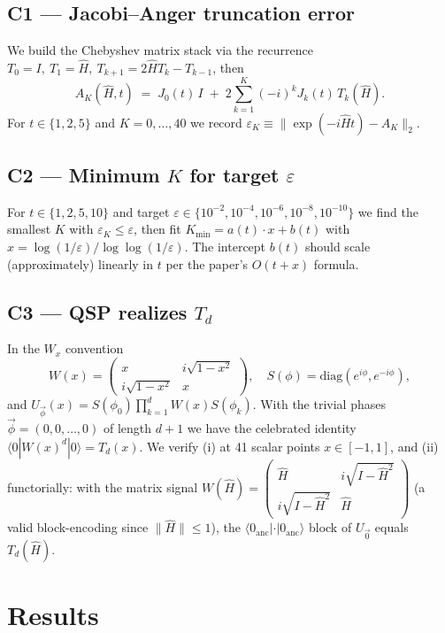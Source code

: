\documentclass[11pt]{article}
\begin{document}
\subsection{C1 --- Jacobi--Anger truncation error}
We build the Chebyshev matrix stack via the recurrence
$T_0=I,\ T_1=\hat H,\ T_{k+1}=2\hat H T_k - T_{k-1}$, then
\[
  A_K(\hat H,t) \;=\; J_0(t)\,I \;+\; 2\sum_{k=1}^{K} (-i)^k J_k(t)\, T_k(\hat H).
\]
For $t\in\{1,2,5\}$ and $K=0,\ldots,40$ we record
$\varepsilon_K \equiv \|\exp(-i\hat H t)-A_K\|_2$.

\subsection{C2 --- Minimum $K$ for target $\varepsilon$}
For $t\in\{1,2,5,10\}$ and target $\varepsilon\in\{10^{-2},10^{-4},10^{-6},10^{-8},10^{-10}\}$
we find the smallest $K$ with $\varepsilon_K\le\varepsilon$, then fit
$K_{\min} = a(t)\cdot x + b(t)$ with $x = \log(1/\varepsilon)/\log\log(1/\varepsilon)$.
The intercept $b(t)$ should scale (approximately) linearly in $t$ per the
paper's $O(t+x)$ formula.

\subsection{C3 --- QSP realizes $T_d$}
In the $W_x$ convention
\[
  W(x)=\begin{pmatrix} x & i\sqrt{1-x^2}\\ i\sqrt{1-x^2} & x\end{pmatrix},
  \quad
  S(\phi)=\mathrm{diag}(e^{i\phi},e^{-i\phi}),
\]
and $U_{\vec\phi}(x)=S(\phi_0)\prod_{k=1}^{d}\!W(x)S(\phi_k)$.
With the trivial phases $\vec\phi = (0,0,\ldots,0)$ of length $d+1$
we have the celebrated identity
$\langle 0|W(x)^d|0\rangle = T_d(x)$.
We verify (i) at 41 scalar points $x\in[-1,1]$, and
(ii) functorially: with the matrix signal
$W(\hat H) = \begin{pmatrix}\hat H & i\sqrt{I-\hat H^2}\\
i\sqrt{I-\hat H^2}& \hat H\end{pmatrix}$
(a valid block-encoding since $\|\hat H\|\le 1$),
the $\langle 0_\mathrm{anc}|\cdot|0_\mathrm{anc}\rangle$ block of
$U_{\vec 0}$ equals $T_d(\hat H)$.

\section{Results}
\end{document}
